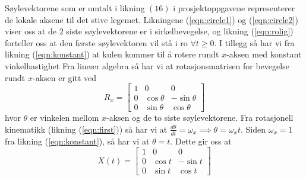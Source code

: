 Søylevektorene som er omtalt i likning $(16)$ i prosjektoppgavene representerer de lokale aksene til det stive legemet. Likningene (\ref{eqn:circle1}) og (\ref{eqn:circle2}) viser oss at de $2$ siste søylevektorene er i sirkelbevegelse, og likning (\ref{eqn:rolig}) forteller oss at den første søylevektoren vil stå i ro $\forall t\geq0.$ I tillegg så har vi fra likning (\ref{eqn:konstant}) at kulen kommer til å rotere rundt $x$-aksen med konstant vinkelhastighet\newline\newline
Fra lineær algebra så har vi at rotasjonsmatrisen for bevegelse rundt $x$-aksen er gitt ved
\begin{equation}
    R_x=\begin{bmatrix}1&0&0\\0&\cos\theta&-\sin\theta\\0&\sin\theta&\cos\theta\end{bmatrix}
\end{equation}
hvor $\theta$ er vinkelen mellom $x$-aksen og de to siste søylevektorene. Fra rotasjonell kinematikk (likning (\ref{eqn:first})) så har vi at $\frac{d\theta}{dt}=\omega_x\implies\theta=\omega_xt.$ Siden $\omega_x=1$ fra likning (\ref{eqn:konstant}), så har vi at $\theta=t.$ Dette gir oss at 
\begin{equation}
    X(t)=\begin{bmatrix}1&0&0\\0&\cos t&-\sin t\\0&\sin t&\cos t\end{bmatrix}
\end{equation}